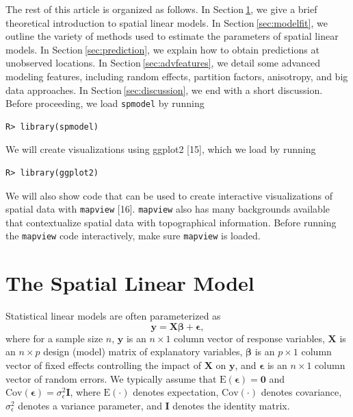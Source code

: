 \documentclass[10pt,letterpaper]{article}
\begin{document}
The rest of this article is organized as follows. In
Section\(~\)\ref{sec:theomodel}, we give a brief theoretical
introduction to spatial linear models. In
Section\(~\)\ref{sec:modelfit}, we outline the variety of methods used
to estimate the parameters of spatial linear models. In
Section\(~\)\ref{sec:prediction}, we explain how to obtain predictions
at unobserved locations. In Section\(~\)\ref{sec:advfeatures}, we detail
some advanced modeling features, including random effects, partition
factors, anisotropy, and big data approaches. In
Section\(~\)\ref{sec:discussion}, we end with a short discussion. Before
proceeding, we load \texttt{spmodel} by running

\begin{verbatim}
R> library(spmodel)
\end{verbatim}

We will create visualizations using ggplot2 {[}15{]}, which we load by
running

\begin{verbatim}
R> library(ggplot2)
\end{verbatim}

We will also show code that can be used to create interactive
visualizations of spatial data with \texttt{mapview} {[}16{]}.
\texttt{mapview} also has many backgrounds available that contextualize
spatial data with topographical information. Before running the
\texttt{mapview} code interactively, make sure \texttt{mapview} is
loaded.

\hypertarget{sec:theomodel}{%
\section{The Spatial Linear Model}\label{sec:theomodel}}

Statistical linear models are often parameterized as
\begin{equation}\label{eq:lm}
 \mathbf{y} = \mathbf{X} \boldsymbol{\beta} + \boldsymbol{\epsilon},
\end{equation} where for a sample size \(n\), \(\mathbf{y}\) is an
\(n \times 1\) column vector of response variables, \(\mathbf{X}\) is an
\(n \times p\) design (model) matrix of explanatory variables,
\(\boldsymbol{\beta}\) is an \(p \times 1\) column vector of fixed
effects controlling the impact of \(\mathbf{X}\) on \(\mathbf{y}\), and
\(\boldsymbol{\epsilon}\) is an \(n \times 1\) column vector of random
errors. We typically assume that
\(\text{E}(\boldsymbol{\epsilon}) = \mathbf{0}\) and
\(\text{Cov}(\boldsymbol{\epsilon}) = \sigma^2_\epsilon \mathbf{I}\),
where \(\text{E}(\cdot)\) denotes expectation, \(\text{Cov}(\cdot)\)
denotes covariance, \(\sigma^2_\epsilon\) denotes a variance parameter,
and \(\mathbf{I}\) denotes the identity matrix.
\end{document}
